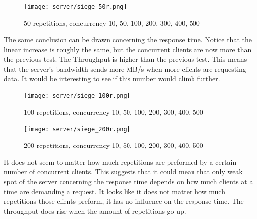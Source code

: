 \vspace{0.5cm}
\begin{figure}[H]
\center
\texttt{[image: server/siege\_50r.png]}
\caption{50 repetitions, concurrency 10, 50, 100, 200, 300, 400, 500}
\end{figure}
The same conclusion can be drawn concerning the response time. Notice that the linear increase is roughly the same, but the concurrent clients are now more than the previous test.
The Throughput is higher than the previous test. This means that the server's bandwidth sends more MB/s when more clients are requesting data. It would be interesting to see if this number would climb further.
\begin{figure}[H]
\center
\texttt{[image: server/siege\_100r.png]}
\caption{100 repetitions, concurrency 10, 50, 100, 200, 300, 400, 500}
\end{figure}

\begin{figure}[H]
\center
\texttt{[image: server/siege\_200r.png]}
\caption{200 repetitions, concurrency 10, 50, 100, 200, 300, 400, 500}
\end{figure}

It does not seem to matter how much repetitions are preformed by a certain number of concurrent clients. This suggests that it could mean that only weak spot of the server concerning the response time depends on how much clients at a time are demanding a request. It looks like it does not matter how much repetitions those clients preform, it has no influence on the response time.
The throughput does rise when the amount of repetitions go up. 

